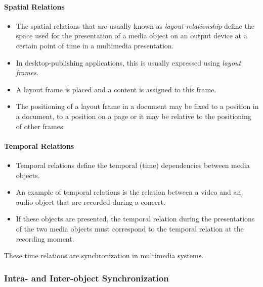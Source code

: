 \paragraph*{Spatial Relations}
\begin{itemize}
	\item The spatial relations that are usually known as \textit{layout relationship} define the space used for the presentation of a media object on an output device at a certain point of time in a multimedia presentation.
	\item In desktop-publishing applications, this is usually expressed using \textit{layout frames}. 
	\item A	layout frame is placed and a content is assigned to this frame. 
	\item The positioning of a layout frame in a document may be fixed to a position in a document, to a position on a page or it may be relative to the positioning of other frames.
\end{itemize}


\paragraph*{Temporal Relations}
\begin{multicols}{2}
	\begin{itemize}
		\item Temporal relations define the temporal (time) dependencies between media objects. 
		\item An example of temporal relations is the relation between a video and an audio object that are recorded during a concert. 
		\item If these objects are presented, the temporal relation during the presentations of the two media objects must correspond to the temporal relation at the recording moment.
	\end{itemize}
\end{multicols}


These time relations are synchronization in multimedia systems.


\subsubsection{Intra- and Inter-object Synchronization}

